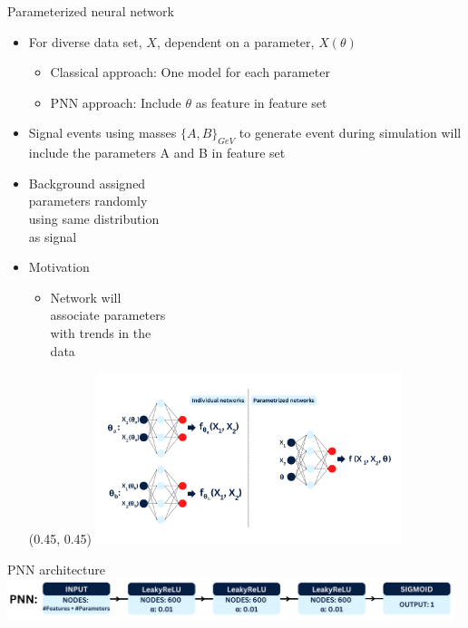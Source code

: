 \documentclass[UKenglish]{beamer}
\begin{document}
\begin{frame}{Parameterized neural network}
    \begin{itemize}
        \item For diverse data set, $X$, dependent on a parameter, $X(\theta)$
        \begin{itemize}
            \item Classical approach: One model for each parameter
            \item PNN approach: Include $\theta$ as feature in feature set
        \end{itemize}
        \item Signal events using masses $\{A,B\}_{GeV}$ to generate 
        event during simulation will include the parameters A and B
        in feature set
        \item Background assigned \\
        parameters randomly \\
        using same distribution\\ 
        as signal
        \item Motivation
        \begin{itemize}
            \item Network will \\
            associate parameters\\
            with trends in the \\
            data
        \end{itemize}
        \begin{textblock}{0.8}(0.45, 0.45)
            \includegraphics[width = 0.7\textwidth]{figures/PNN.png}
        \end{textblock}
    \end{itemize}
\end{frame}
\begin{frame}{PNN architecture}
    \vfill
    \includegraphics[width = 0.98\textwidth]{figures/PNNArch.png}
\end{frame}
\end{document}
